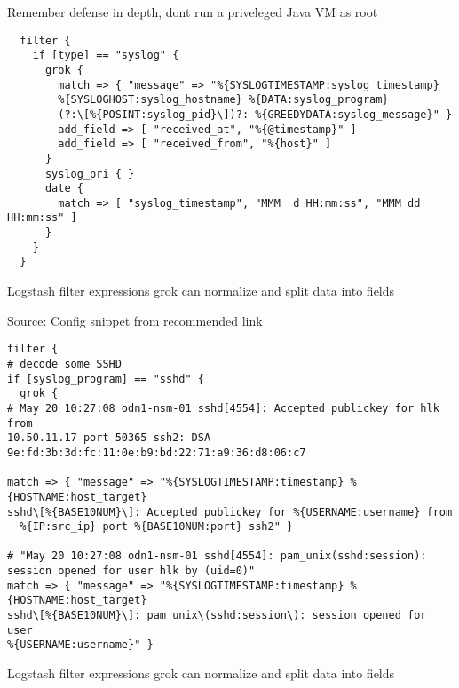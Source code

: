 \documentclass[Screen16to9,17pt]{foils}
\begin{document}
Remember defense in depth, dont run a priveleged Java VM as root \smiley


{\footnotesize
\begin{verbatim}
  filter {
    if [type] == "syslog" {
      grok {
        match => { "message" => "%{SYSLOGTIMESTAMP:syslog_timestamp}
        %{SYSLOGHOST:syslog_hostname} %{DATA:syslog_program}
        (?:\[%{POSINT:syslog_pid}\])?: %{GREEDYDATA:syslog_message}" }
        add_field => [ "received_at", "%{@timestamp}" ]
        add_field => [ "received_from", "%{host}" ]
      }
      syslog_pri { }
      date {
        match => [ "syslog_timestamp", "MMM  d HH:mm:ss", "MMM dd HH:mm:ss" ]
      }
    }
  }
\end{verbatim}
}

\begin{list2}
\item Logstash filter expressions grok can normalize and split data into fields
\end{list2}

Source:
Config snippet from recommended link\\
{\small{}}



{\footnotesize
\begin{verbatim}
filter {
# decode some SSHD
if [syslog_program] == "sshd" {
  grok {
# May 20 10:27:08 odn1-nsm-01 sshd[4554]: Accepted publickey for hlk from
10.50.11.17 port 50365 ssh2: DSA 9e:fd:3b:3d:fc:11:0e:b9:bd:22:71:a9:36:d8:06:c7

match => { "message" => "%{SYSLOGTIMESTAMP:timestamp} %{HOSTNAME:host_target}
sshd\[%{BASE10NUM}\]: Accepted publickey for %{USERNAME:username} from
  %{IP:src_ip} port %{BASE10NUM:port} ssh2" }

# "May 20 10:27:08 odn1-nsm-01 sshd[4554]: pam_unix(sshd:session):
session opened for user hlk by (uid=0)"
match => { "message" => "%{SYSLOGTIMESTAMP:timestamp} %{HOSTNAME:host_target}
sshd\[%{BASE10NUM}\]: pam_unix\(sshd:session\): session opened for user
%{USERNAME:username}" }
\end{verbatim}
}

\begin{list2}
\item Logstash filter expressions grok can normalize and split data into fields
\end{list2}
\end{document}
